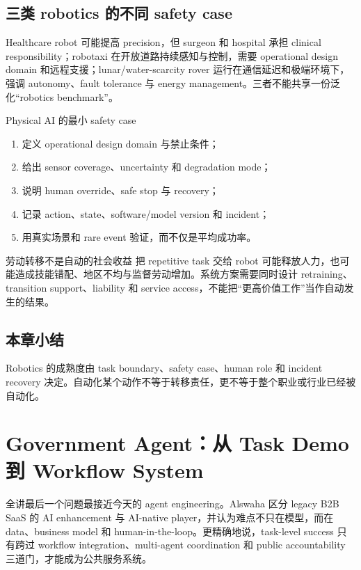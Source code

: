 \documentclass[a4paper]{article}
\begin{document}
\subsection{三类 robotics 的不同 safety case}

Healthcare robot 可能提高 precision，但 surgeon 和 hospital 承担 clinical responsibility；robotaxi 在开放道路持续感知与控制，需要 operational design domain 和远程支援；lunar/water-scarcity rover 运行在通信延迟和极端环境下，强调 autonomy、fault tolerance 与 energy management。三者不能共享一份泛化“robotics benchmark”。

\begin{importantbox}{Physical AI 的最小 safety case}
\begin{enumerate}
  \item 定义 operational design domain 与禁止条件；
  \item 给出 sensor coverage、uncertainty 和 degradation mode；
  \item 说明 human override、safe stop 与 recovery；
  \item 记录 action、state、software/model version 和 incident；
  \item 用真实场景和 rare event 验证，而不仅是平均成功率。
\end{enumerate}
\end{importantbox}

\begin{warningbox}{劳动转移不是自动的社会收益}
把 repetitive task 交给 robot 可能释放人力，也可能造成技能错配、地区不均与监督劳动增加。系统方案需要同时设计 retraining、transition support、liability 和 service access，不能把“更高价值工作”当作自动发生的结果。
\end{warningbox}

\subsection{本章小结}

Robotics 的成熟度由 task boundary、safety case、human role 和 incident recovery 决定。自动化某个动作不等于转移责任，更不等于整个职业或行业已经被自动化。

\section{Government Agent：从 Task Demo 到 Workflow System}

全讲最后一个问题最接近今天的 agent engineering。Alswaha 区分 legacy B2B SaaS 的 AI enhancement 与 AI-native player，并认为难点不只在模型，而在 data、business model 和 human-in-the-loop。更精确地说，task-level success 只有跨过 workflow integration、multi-agent coordination 和 public accountability 三道门，才能成为公共服务系统。
\end{document}
